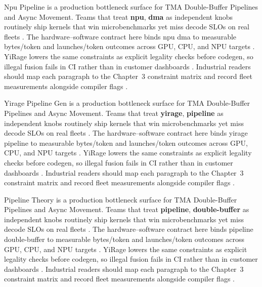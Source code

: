 Npu Pipeline is a production bottleneck surface for TMA Double-Buffer Pipelines and Async Movement. Teams that treat \textbf{npu}, \textbf{dma} as independent knobs routinely ship kernels that win microbenchmarks yet miss decode SLOs on real fleets \citep{dlbook,nvidia2024cudagraphs}. The hardware--software contract here binds npu dma to measurable bytes/token and launches/token outcomes across GPU, CPU, and NPU targets \citep{dao2022flashattention,liu2024deepseekv3}. YiRage lowers the same constraints as explicit legality checks before codegen, so illegal fusion fails in CI rather than in customer dashboards \citep{kwon2023vllm,patel2025llminference}. Industrial readers should map each paragraph to the Chapter~3 constraint matrix and record fleet measurements alongside compiler flags \citep{nvidia2024cudagraphs,taxbreak2026}.

Yirage Pipeline Gen is a production bottleneck surface for TMA Double-Buffer Pipelines and Async Movement. Teams that treat \textbf{yirage}, \textbf{pipeline} as independent knobs routinely ship kernels that win microbenchmarks yet miss decode SLOs on real fleets \citep{dao2022flashattention,liu2024deepseekv3}. The hardware--software contract here binds yirage pipeline to measurable bytes/token and launches/token outcomes across GPU, CPU, and NPU targets \citep{kwon2023vllm,patel2025llminference}. YiRage lowers the same constraints as explicit legality checks before codegen, so illegal fusion fails in CI rather than in customer dashboards \citep{nvidia2024cudagraphs,taxbreak2026}. Industrial readers should map each paragraph to the Chapter~3 constraint matrix and record fleet measurements alongside compiler flags \citep{liu2024deepseekv3,memoryfloor2026}.

Pipeline Theory is a production bottleneck surface for TMA Double-Buffer Pipelines and Async Movement. Teams that treat \textbf{pipeline}, \textbf{double-buffer} as independent knobs routinely ship kernels that win microbenchmarks yet miss decode SLOs on real fleets \citep{kwon2023vllm,patel2025llminference}. The hardware--software contract here binds pipeline double-buffer to measurable bytes/token and launches/token outcomes across GPU, CPU, and NPU targets \citep{nvidia2024cudagraphs,taxbreak2026}. YiRage lowers the same constraints as explicit legality checks before codegen, so illegal fusion fails in CI rather than in customer dashboards \citep{liu2024deepseekv3,memoryfloor2026}. Industrial readers should map each paragraph to the Chapter~3 constraint matrix and record fleet measurements alongside compiler flags \citep{patel2025llminference,nvidia2022hopper}.


